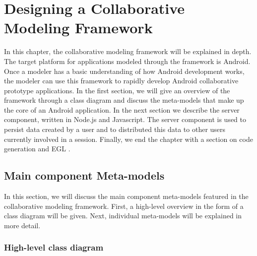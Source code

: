 \chapter{Designing a Collaborative Modeling Framework}

In this chapter, the collaborative modeling framework will be explained in depth. The target platform for applications modeled through the framework is Android. Once a modeler has a basic understanding of how Android development works, the modeler can use this framework to rapidly develop Android collaborative prototype applications. In the first section, we will give an overview of the framework through a class diagram and discuss the meta-models that make up the core of an Android application. In the next section we describe the server component, written in Node.js \cite{NodeJS} and Javascript. The server component is used to persist data created by a user and to distributed this data to other users currently involved in a session. Finally, we end the chapter with a section on code generation and EGL \cite{EGL}.



\section{Main component Meta-models}

In this section, we will discuss the main component meta-models featured in the collaborative modeling framework. First, a high-level overview in the form of a class diagram will be given. Next, individual meta-models will be explained in more detail.

\subsection{High-level class diagram}

